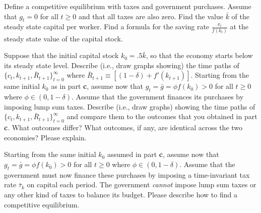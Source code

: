  Define a competitive equilibrium with taxes and government purchases. \medskip
{}  Assume that $g_t =0 $ for all $t \geq 0$ and that all taxes are also zero.  Find the value $\bar k$ of the steady state capital per worker. Find a formula
for the saving rate $\frac{x_t}{f(k_t)}$ at the steady state value of the capital stock.\medskip

 Suppose that the initial capital stock $k_0 = .5 \bar k$, so that the economy starts below its steady state level.
Describe (i.e., draw graphs showing) the time paths of $\{c_t, k_{t+1}, \bar R_{t+1}\}_{t=0}^\infty $ where $\bar R_{t+1} \equiv [(1-\delta) + f'(k_{t+1})]$.\medskip
{} Starting from the same initial $k_0$ as in part {\bf c}, assume now that $g_t = \bar g = \phi f(k_0) >0 $ for all $t \geq 0$ where $\phi \in (0, 1-\delta)$. Assume that the
government finances its purchases by imposing lump sum taxes.
Describe (i.e., draw graphs) showing the time paths of $\{c_t, k_{t+1}, \bar R_{t+1}\}_{t=0}^\infty $ %
and compare them to the outcomes
that you obtained in part {\bf c}.  What outcomes differ? What outcomes, if any, are identical across the two economies? Please explain. \medskip

  Starting from the same initial $k_0$ assumed in part {\bf c}, assume now that $g_t = \bar g = \phi f(k_0) >0 $ for all $t \geq 0$ where $\phi \in (0, 1-\delta)$. Assume that the
government must now finance these  purchases by imposing a time-invariant tax rate $\bar \tau_k$ on capital each period. The government {\it cannot} impose lump sum taxes or any other kind of taxes
to balance its budget.   Please describe how to find a competitive equilibrium. %

%


